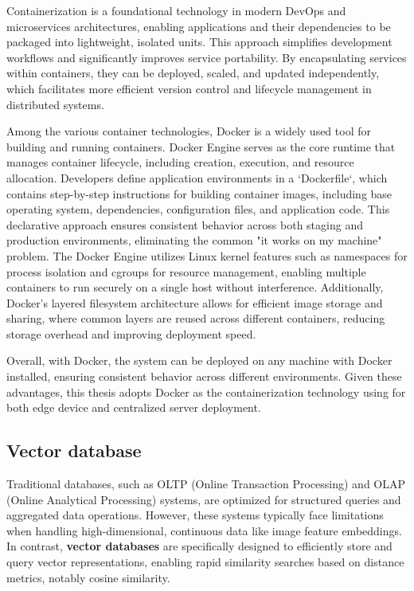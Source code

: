 \documentclass[../main.tex]{subfiles}
\begin{document}
Containerization is a foundational technology in modern DevOps and microservices architectures, enabling applications and their dependencies to be packaged into lightweight, isolated units. This approach simplifies development workflows and significantly improves service portability. By encapsulating services within containers, they can be deployed, scaled, and updated independently, which facilitates more efficient version control and lifecycle management in distributed systems.

Among the various container technologies, Docker \cite{docker_intro} is a widely used tool for building and running containers. Docker Engine serves as the core runtime that manages container lifecycle, including creation, execution, and resource allocation. Developers define application environments in a `Dockerfile`, which contains step-by-step instructions for building container images, including base operating system, dependencies, configuration files, and application code. This declarative approach ensures consistent behavior across both staging and production environments, eliminating the common "it works on my machine" problem. The Docker Engine utilizes Linux kernel features such as namespaces for process isolation and cgroups for resource management, enabling multiple containers to run securely on a single host without interference. Additionally, Docker's layered filesystem architecture allows for efficient image storage and sharing, where common layers are reused across different containers, reducing storage overhead and improving deployment speed.

Overall, with Docker, the system can be deployed on any machine with Docker installed, ensuring consistent behavior across different environments. Given these advantages, this thesis adopts Docker as the containerization technology using for both edge device and centralized server deployment.

\subsection{Vector database}
\label{sec:vector_database}

Traditional databases, such as OLTP (Online Transaction Processing) and OLAP (Online Analytical Processing) systems, are optimized for structured queries and aggregated data operations. However, these systems typically face limitations when handling high-dimensional, continuous data like image feature embeddings. In contrast, \textbf{vector databases} are specifically designed to efficiently store and query vector representations, enabling rapid similarity searches based on distance metrics, notably cosine similarity.
\end{document}
